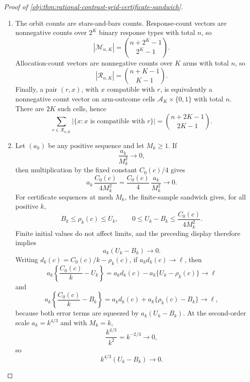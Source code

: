 \begin{proof}[Proof of \cref{obj:thm:rational-contrast-grid-certificate-sandwich}]
\begin{enumerate}
\item The orbit counts are stars-and-bars counts.  Response-count vectors are nonnegative counts over \(2^K\) binary response types with total \(n\), so
\[
|\mathcal M_{n,K}|=\binom{n+2^K-1}{2^K-1}.
\]
Allocation-count vectors are nonnegative counts over \(K\) arms with total \(n\), so
\[
|\mathcal R_{n,K}|=\binom{n+K-1}{K-1}.
\]
Finally, a pair \((r,x)\), with \(x\) compatible with \(r\), is equivalently a nonnegative count vector on arm-outcome cells \(\mathcal A_K\times\{0,1\}\) with total \(n\).  There are \(2K\) such cells, hence
\[
\sum_{r\in\mathcal R_{n,K}}|\{x:x\text{ is compatible with }r\}|
=
\binom{n+2K-1}{2K-1}.
\]

\item Let \((a_k)\) be any positive sequence and let \(M_k\geq1\).  If
\[
\frac{a_k}{M_k^2}\longrightarrow0,
\]
then multiplication by the fixed constant \(C_0(c)/4\) gives
\[
a_k\,\frac{C_0(c)}{4M_k^2}
=
\frac{C_0(c)}{4}\,\frac{a_k}{M_k^2}
\longrightarrow0.
\]
For certificate sequences at mesh \(M_k\), the finite-sample sandwich gives, for all positive \(k\),
\[
B_k\leq\rho_k(c)\leq U_k,
\qquad
0\leq U_k-B_k\leq \frac{C_0(c)}{4M_k^2}.
\]
Finite initial values do not affect limits, and the preceding display therefore implies
\[
a_k(U_k-B_k)\longrightarrow0.
\]
Writing \(d_k(c)=C_0(c)/k-\rho_k(c)\), if \(a_kd_k(c)\to\ell\), then
\[
a_k\left\{\frac{C_0(c)}{k}-U_k\right\}
=
a_kd_k(c)-a_k\{U_k-\rho_k(c)\}
\longrightarrow\ell
\]
and
\[
a_k\left\{\frac{C_0(c)}{k}-B_k\right\}
=
a_kd_k(c)+a_k\{\rho_k(c)-B_k\}
\longrightarrow\ell,
\]
because both error terms are squeezed by \(a_k(U_k-B_k)\).  At the second-order scale \(a_k=k^{4/3}\) and with \(M_k=k\),
\[
\frac{k^{4/3}}{k^2}=k^{-2/3}\longrightarrow0,
\]
so
\[
k^{4/3}(U_k-B_k)\longrightarrow0.
\]
\end{enumerate}
\end{proof}

